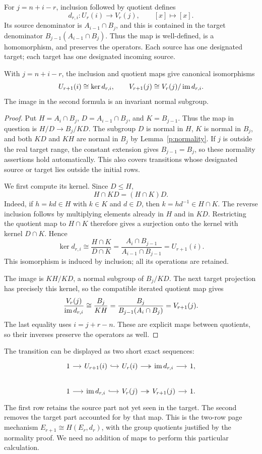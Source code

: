 For $j=n+i-r$, inclusion followed by quotient defines
\begin{equation}\label{p:differential}
 d_{r,i}:U_r(i)\longrightarrow V_r(j),\qquad [x]\longmapsto[x].
\end{equation}
Its source denominator is $A_{i-1}\cap B_j$, and this is contained in
the target denominator $B_{j-1}(A_{i-1}\cap B_j)$. Thus the map is
well-defined, is a homomorphism, and preserves the operators. Each source
has one designated target; each target has one designated incoming source.

\begin{proposition}\label{p:transition}
With $j=n+i-r$, the inclusion and quotient maps give canonical
isomorphisms
\[
 U_{r+1}(i)\cong\ker d_{r,i},\qquad
 V_{r+1}(j)\cong V_r(j)/\operatorname{im} d_{r,i}.
\]
The image in the second formula is an invariant normal subgroup.
\end{proposition}
\begin{proof}
Put $H=A_i\cap B_j$, $D=A_{i-1}\cap B_j$, and $K=B_{j-1}$.
Thus the map in question is $H/D\to B_j/KD$. The subgroup $D$ is
normal in $H$, $K$ is normal in $B_j$, and both $KD$ and $KH$ are
normal in $B_j$ by Lemma~\ref{p:normality}. If $j$ is outside the real
target range, the constant extension gives $B_{j-1}=B_j$, so these
normality assertions hold automatically. This also covers transitions
whose designated source or target lies outside the initial rows.

We first compute its kernel. Since $D\leq H$,
\[
                     H\cap KD=(H\cap K)D.
\]
Indeed, if $h=kd\in H$ with $k\in K$ and $d\in D$, then
$k=hd^{-1}\in H\cap K$. The reverse inclusion follows by multiplying
elements already in $H$ and in $KD$. Restricting the quotient map to
$H\cap K$ therefore gives a surjection onto the kernel with kernel
$D\cap K$. Hence
\[
 \ker d_{r,i}\cong\frac{H\cap K}{D\cap K}
 =\frac{A_i\cap B_{j-1}}{A_{i-1}\cap B_{j-1}}
 =U_{r+1}(i).
\]
This isomorphism is induced by inclusion; all its operations are retained.

The image is $KH/KD$, a normal subgroup of $B_j/KD$. The next target
projection has precisely this kernel, so the compatible iterated quotient
map gives
\[
 \frac{V_r(j)}{\operatorname{im} d_{r,i}}
 \cong \frac{B_j}{KH}
 =\frac{B_j}{B_{j-1}(A_i\cap B_j)}
 =V_{r+1}(j).
\]
The last equality uses $i=j+r-n$. These are explicit maps between
quotients, so their inverses preserve the operators as well.
\end{proof}

The transition can be displayed as two short exact sequences:
\[
\begin{tikzcd}[column sep=small]
1\arrow[r]&U_{r+1}(i)\arrow[r,hook]&U_r(i)
 \arrow[r,two heads]&\im d_{r,i}\arrow[r]&1,\\
1\arrow[r]&\im d_{r,i}\arrow[r,hook]&V_r(j)
 \arrow[r,two heads]&V_{r+1}(j)\arrow[r]&1.
\end{tikzcd}
\]
The first row retains the source part not yet seen in the target. The
second removes the target part accounted for by that map. This is the
two-row page mechanism $E_{r+1}\cong H(E_r,d_r)$, with the group
quotients justified by the normality proof. We need no addition of maps
to perform this particular calculation.

